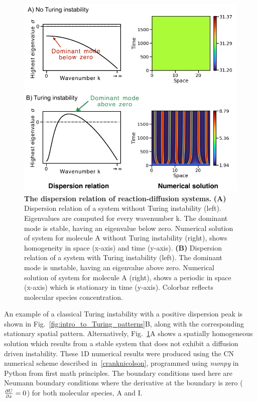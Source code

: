 \begin{figure}[H] %
    \centering
    \includegraphics[width=1\textwidth]{chapters/Chapter 1/turing_vs_noturing} %
    \caption{\textbf{The dispersion relation of reaction-diffusion systems.} \textbf{(A)} Dispersion relation of a system without Turing instability (left). Eigenvalues are computed for every wavenumber k. The dominant mode is stable, having an eigenvalue below zero. Numerical solution of system for molecule A without Turing instability (right), shows homogeneity in space (x-axis) and time (y-axis).  \textbf{(B)} Dispersion relation of a system with Turing instability (left). The dominant mode is unstable, having an eigenvalue above zero. Numerical solution of system for molecule A (right), shows a periodic in space (x-axis) which is stationary in time (y-axis). Colorbar reflects molecular species concentration.}
    \label{fig:turing_vs_noturing} %
\end{figure}
An example of a classical Turing instability with a positive dispersion peak is shown in Fig.~\ref{fig:intro_to_Turing_patterns}B, along with the corresponding stationary spatial pattern.
Alternatively, Fig.~\ref{fig:turing_vs_noturing}A shows a spatially homogeneous solution which results from a stable system that does not exhibit a diffusion driven instability.
These 1D numerical results were produced using the \acrfull{CN} numerical scheme described in~\ref{cranknicolson}, programmed using \textit{numpy} in Python from first math principles.
The boundary conditions used here are Neumann boundary conditions where the derivative at the boundary is zero ($\pdv{U}{x}=0$) for both molecular species, A and I.

